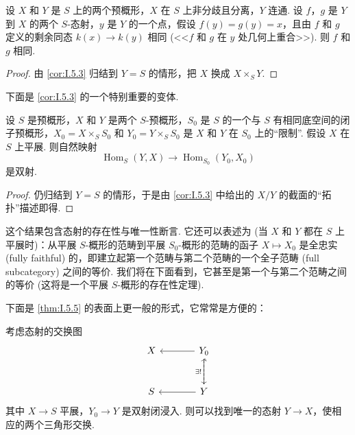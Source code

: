 \begin{corollary}\label{cor:I.5.4}
设 $X$ 和 $Y$ 是 $S$ 上的两个预概形，$X$ 在 $S$ 上非分歧且分离，$Y$ 连通. 设 $f$，$g$ 是 $Y$ 到 $X$ 的两个 $S$-态射，$y$ 是 $Y$ 的一个点，假设 $f(y) = g(y) = x$，且由 $f$ 和 $g$ 定义的剩余同态 $k(x) \to k(y)$ 相同 (<<$f$ 和 $g$ 在 $y$ 处几何上重合>>). 则 $f$ 和 $g$ 相同.
\end{corollary}

\begin{proof}
由 \ref{cor:I.5.3} 归结到 $Y = S$ 的情形，把 $X$ 换成 $X \times_S Y$.
\end{proof}

下面是 \ref{cor:I.5.3} 的一个特别重要的变体.

\begin{theorem}\label{thm:I.5.5}
设 $S$ 是预概形，$X$ 和 $Y$ 是两个 $S$-预概形，$S_0$ 是 $S$ 的一个与 $S$ 有相同底空间的闭子预概形，$X_0 = X \times_S S_0$ 和 $Y_0 = Y \times_S S_0$ 是 $X$ 和 $Y$ 在 $S_0$ 上的``限制''. 假设 $X$ 在 $S$ 上平展. 则自然映射
\[
\operatorname{Hom}_{S}(Y, X) \longrightarrow \operatorname{Hom}_{S_0}(Y_0, X_0)
\]
是双射.
\end{theorem}

\begin{proof}
仍归结到 $Y = S$ 的情形，于是由 \ref{cor:I.5.3} 中给出的 $X/Y$ 的截面的``拓扑''描述即得.
\end{proof}

\begin{scholie}
这个结果包含态射的存在性与唯一性断言. 它还可以表述为 (当 $X$ 和 $Y$ 都在 $S$ 上平展时)：从平展 $S$-概形的范畴到平展 $S_0$-概形的范畴的函子 $X \mapsto X_0$ 是全忠实 (fully faithful) 的，即建立起第一个范畴与第二个范畴的一个全子范畴 (full subcategory) 之间的等价. 我们将在下面看到，它甚至是第一个与第二个范畴之间的等价 (这将是一个平展 $S$-概形的存在性定理).
\end{scholie}

下面是 \ref{thm:I.5.5} 的表面上更一般的形式，它常常是方便的：

\begin{corollary}\label{cor:I.5.6}
考虑态射的交换图
\[
\begin{tikzcd}[row sep=large, column sep=large]
X & Y_0 \arrow[l] \arrow[d, hook] \\
S & Y \arrow[l] \arrow[u, dashed, "\exists!"]
\end{tikzcd}
\]
其中 $X \to S$ 平展，$Y_0 \to Y$ 是双射闭浸入. 则可以找到唯一的态射 $Y \to X$，使相应的两个三角形交换.
\end{corollary}

